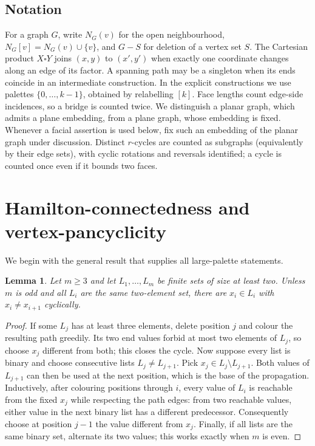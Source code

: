 \documentclass[11pt]{article}
\newtheorem{lemma}[theorem]{Lemma}
\theoremstyle{remark}
\numberwithin{equation}{section}
\numberwithin{table}{section}
\begin{document}
\subsection{Notation}
For a graph $G$, write $N_G(v)$ for the open neighbourhood,
$N_G[v]=N_G(v)\cup\{v\}$, and $G-S$ for deletion of a vertex set $S$.
The Cartesian product $X\square Y$ joins $(x,y)$ to $(x',y')$ when
exactly one coordinate changes along an edge of its factor.
A spanning path may be a singleton when its ends coincide in an
intermediate construction. In the explicit constructions we use palettes
$\{0,\ldots,k-1\}$, obtained by relabelling $[k]$.
Face lengths count edge-side incidences, so a bridge is counted twice.
We distinguish a planar graph, which admits a plane embedding, from a
plane graph, whose embedding is fixed.  Whenever a facial assertion is
used below, fix such an embedding of the planar graph under discussion.
Distinct $r$-cycles are counted as subgraphs (equivalently by their edge
sets), with cyclic rotations and reversals identified; a cycle is counted
once even if it bounds two faces.

\section{Hamilton-connectedness and vertex-pancyclicity}
\label{sec:degenerate}

We begin with the general result that supplies all large-palette statements.

\begin{lemma}
\label{lem:list-cycle}
Let $m\ge3$ and let $L_1,\ldots,L_m$ be finite sets of size at least two.  Unless $m$ is odd and all $L_i$ are the same two-element set, there are $x_i\in L_i$ with $x_i\ne x_{i+1}$ cyclically.
\end{lemma}

\begin{proof}
If some $L_j$ has at least three elements, delete position $j$ and
colour the resulting path greedily.  Its two end values forbid at most
two elements of $L_j$, so choose $x_j$ different from both; this closes
the cycle.  Now suppose every list is binary and choose consecutive
lists $L_j\ne L_{j+1}$.  Pick $x_j\in L_j\setminus L_{j+1}$.
Both values of $L_{j+1}$ can then be used at the next position,
which is the base of the propagation.  Inductively, after colouring
positions through $i$, every value of
$L_i$ is reachable from the fixed $x_j$ while respecting the path
edges: from two reachable values, either value in the next binary list
has a different predecessor.  Consequently choose at position $j-1$
the value different from $x_j$.  Finally, if all lists are the same
binary set, alternate its two values; this works exactly when $m$ is
even.
\end{proof}
\end{document}
